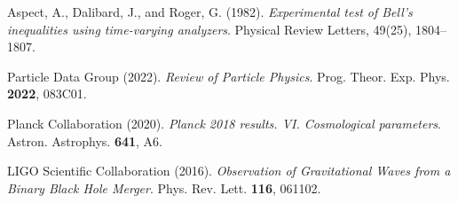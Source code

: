 \documentclass[12pt,a4paper]{article}
\begin{document}
\begin{thebibliography}{99}
		Aspect, A., Dalibard, J., and Roger, G. (1982). \textit{Experimental test of Bell's inequalities using time-varying analyzers}. 
		Physical Review Letters, 49(25), 1804--1807.
		
		Particle Data Group (2022). \textit{Review of Particle Physics}. 
		Prog. Theor. Exp. Phys. \textbf{2022}, 083C01.
		
		Planck Collaboration (2020). \textit{Planck 2018 results. VI. Cosmological parameters}. 
		Astron. Astrophys. \textbf{641}, A6.
		
		LIGO Scientific Collaboration (2016). \textit{Observation of Gravitational Waves from a Binary Black Hole Merger}. 
		Phys. Rev. Lett. \textbf{116}, 061102.
		
	\end{thebibliography}
	
\end{document}
